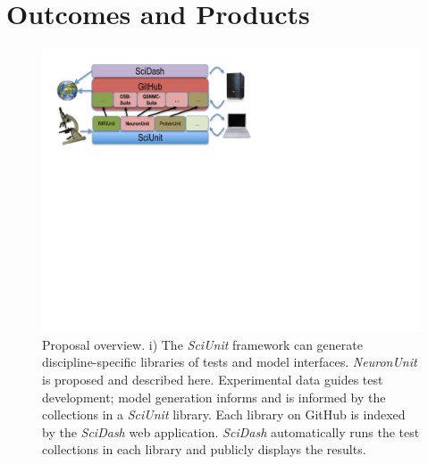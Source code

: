\documentclass[11pt,letterpaper]{article}
\begin{document}
\section{Outcomes and Products}
\begin{figure}
\vspace{-20px}
\includegraphics[scale=0.65]{sciunit_overview.pdf}
\caption{Proposal overview. \scriptsize{i) The \textit{SciUnit} framework can generate discipline-specific libraries of tests and model interfaces.  \textit{NeuronUnit} is proposed and described here.  Experimental data guides test development; model generation informs and is informed by the collections in a \textit{SciUnit} library.  Each  library on GitHub is indexed by the \textit{SciDash} web application.  \textit{SciDash} automatically runs the test collections in each library and publicly displays the results.}}
\vspace{-10px}
\label{fig:sciunit_overview}
\end{figure}
\leavevmode
\end{document}

